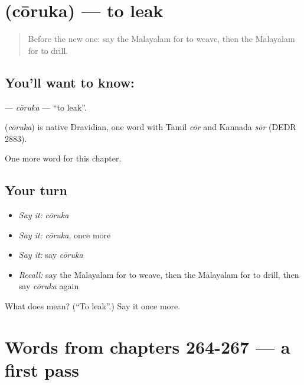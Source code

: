 \section[\texorpdfstring{\ml{ചോരുക} (cōruka)}{ചോരുക (cōruka)}]{ (cōruka) — to leak}

\label{lesson:ML-C272-coruka}



\begin{quote}
Before the new one: say the Malayalam for to weave, then the Malayalam for to drill.
\end{quote}

\subsection*{You'll want to know: }
\textbf{} — \emph{cōruka} — \textquotedblleft{}to leak\textquotedblright{}.

\begin{cousinweb}
\textbf{} (\emph{cōruka}) is native Dravidian, one word with Tamil \emph{cōr} and Kannada \emph{sōr} (DEDR 2883).
\end{cousinweb}

\begin{grammarlens}[title={What you've built}]
One more word for this chapter.
\end{grammarlens}

\subsection*{Your turn}
\begin{itemize}
\raggedright
  \item \emph{Say it:} \emph{cōruka}
  \item \emph{Say it:} \emph{cōruka}, once more
  \item \emph{Say it:} say \emph{cōruka}
  \item \emph{Recall:} say the Malayalam for to weave, then the Malayalam for to drill, then say \emph{cōruka} again
\end{itemize}

\begin{tcolorbox}[breakable,colback=teal!4,colframe=teal!35!black,title={Before you move on}]
What does  mean? (\textquotedblleft{}To leak\textquotedblright{}.) Say it once more.
\end{tcolorbox}
\section[(dialogue)]{Words from chapters 264-267 — a first pass}

